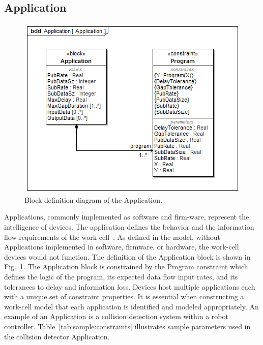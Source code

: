 \subsection{Application}\label{sysml:sec:application}

\begin{figure}[tbp]
	\centering
	\includegraphics[width=0.8\columnwidth]{./chapter-sysml/diagrams/bdd__Application__Application}
	\caption{Block definition diagram of the Application.}
	\label{sysml:fig:application:bdd}
\end{figure}

Applications, commonly implemented as software and firm-ware, represent the intelligence of devices. The application defines the behavior and the information flow requirements of the work-cell~\cite{appWorkcell1996, appWorkcell2001, appWorkcell2011}.  As defined in the model, without Applications implemented in software, firmware, or hardware, the work-cell devices would not function.  The definition of the Application block is shown in Fig.~\ref{sysml:fig:application:bdd}.  The Application block is constrained by the Program constraint which defines the logic of the program, its expected data flow input rates, and its tolerances to delay and information loss.  Devices host multiple applications each with a unique set of constraint properties.  It is essential when constructing a work-cell model that each application is identified and modeled appropriately.  An example of an Application is a collision detection system within a robot controller. Table~\ref{tab:sample:constraints} illustrates sample parameters used in the collision detector Application.

